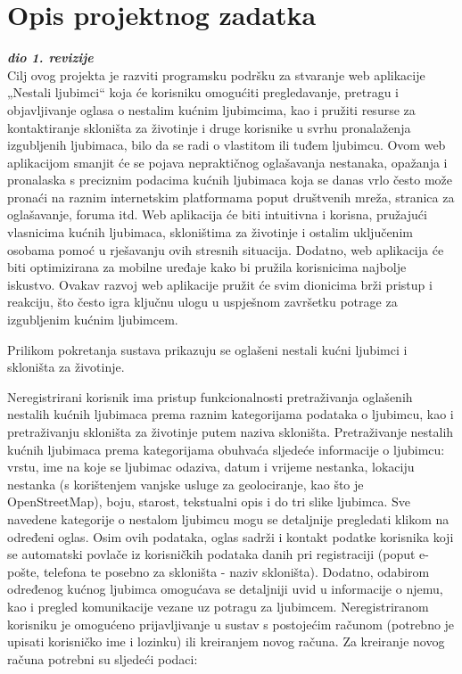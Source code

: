 \chapter{Opis projektnog zadatka}
		
		\textbf{\textit{dio 1. revizije}}\\
		
		Cilj ovog projekta je razviti programsku podršku za stvaranje web aplikacije „Nestali ljubimci“ koja će korisniku omogućiti pregledavanje, pretragu i objavljivanje oglasa o nestalim kućnim ljubimcima, kao i pružiti resurse za kontaktiranje skloništa za životinje i druge korisnike u svrhu pronalaženja izgubljenih ljubimaca, bilo da se radi o vlastitom ili tuđem ljubimcu. Ovom web aplikacijom smanjit će se pojava nepraktičnog oglašavanja nestanaka, opažanja i pronalaska s preciznim podacima kućnih ljubimaca koja se danas vrlo često može pronaći na raznim internetskim platformama poput društvenih mreža, stranica za oglašavanje, foruma itd. Web aplikacija će biti intuitivna i korisna, pružajući vlasnicima kućnih ljubimaca, skloništima za životinje i ostalim uključenim osobama pomoć u rješavanju ovih stresnih situacija. Dodatno, web aplikacija će biti optimizirana za mobilne uređaje kako bi pružila korisnicima najbolje iskustvo. Ovakav razvoj web aplikacije pružit će svim dionicima brži pristup i reakciju, što često igra ključnu ulogu u uspješnom završetku potrage za izgubljenim kućnim ljubimcem.
		
		Prilikom pokretanja sustava prikazuju se oglašeni nestali kućni ljubimci i skloništa za životinje.
		
		Neregistrirani korisnik ima pristup funkcionalnosti pretraživanja oglašenih nestalih kućnih ljubimaca prema raznim kategorijama podataka o ljubimcu, kao i pretraživanju skloništa za životinje putem naziva skloništa. Pretraživanje nestalih kućnih ljubimaca prema kategorijama obuhvaća sljedeće informacije o ljubimcu: vrstu, ime na koje se ljubimac odaziva, datum i vrijeme nestanka, lokaciju nestanka (s korištenjem vanjske usluge za geolociranje, kao što je OpenStreetMap), boju, starost, tekstualni opis i do tri slike ljubimca. Sve navedene kategorije o nestalom ljubimcu mogu se detaljnije pregledati klikom na određeni oglas. Osim ovih podataka, oglas sadrži i kontakt podatke korisnika koji se automatski povlače iz korisničkih podataka danih pri registraciji (poput e-pošte, telefona te posebno za skloništa - naziv skloništa). Dodatno, odabirom određenog kućnog ljubimca omogućava se detaljniji uvid u informacije o njemu, kao i pregled komunikacije vezane uz potragu za ljubimcem. Neregistriranom korisniku je omogućeno prijavljivanje u sustav s postojećim računom (potrebno je upisati korisničko ime i lozinku) ili kreiranjem novog računa. Za kreiranje novog računa potrebni su sljedeći podaci:
		
